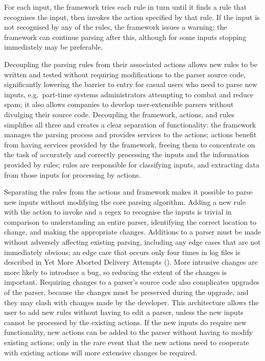 For each input, the framework tries each rule in turn until it finds a rule
that recognises the input, then invokes the action specified by that rule.
If the input is not recognised by any of the rules, the framework issues a
warning; the framework can continue parsing after this, although for some
inputs stopping immediately may be preferable.

\label{why separate rules, actions, and framework?}

Decoupling the parsing rules from their associated actions allows new rules
to be written and tested without requiring modifications to the parser
source code, significantly lowering the barrier to entry for casual users
who need to parse new inputs, e.g.\ part-time systems administrators
attempting to combat and reduce spam; it also allows companies to develop
user-extensible parsers without divulging their source code.  Decoupling
the framework, actions, and rules simplifies all three and creates a clear
separation of functionality: the framework manages the parsing process and
provides services to the actions; actions benefit from having services
provided by the framework, freeing them to concentrate on the task of
accurately and correctly processing the inputs and the information provided
by rules; rules are responsible for classifying inputs, and extracting data
from those inputs for processing by actions.

Separating the rules from the actions and framework makes it possible to
parse new inputs without modifying the core parsing algorithm.  Adding a
new rule with the action to invoke and a regex to recognise the inputs is
trivial in comparison to understanding an entire parser, identifying the
correct location to change, and making the appropriate changes.  Additions
to a parser must be made without adversely affecting existing parsing,
including any edge cases that are not immediately obvious; an edge case
that occurs only four times in \numberOFlogFILES{} log files is described
in Yet More Aborted Delivery Attempts
().  More intrusive changes
are more likely to introduce a bug, so reducing the extent of the changes
is important.  Requiring changes to a parser's source code also complicates
upgrades of the parser, because the changes must be preserved during the
upgrade, and they may clash with changes made by the developer.  This
architecture allows the user to add new rules without having to edit a
parser, unless the new inputs cannot be processed by the existing actions.
If the new inputs do require new functionality, new actions can be added to
the parser without having to modify existing actions; only in the rare
event that the new actions need to cooperate with existing actions will
more extensive changes be required.

